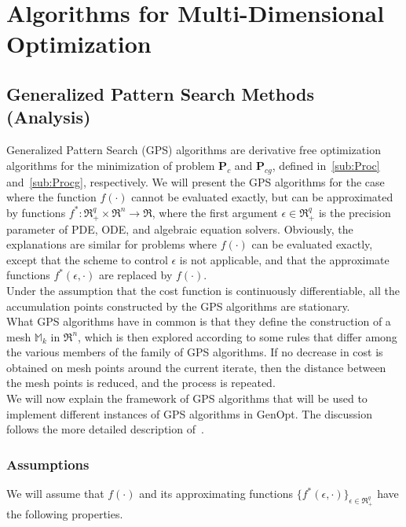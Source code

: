 \chapter{Algorithms for Multi-Dimensional Optimization}
\label{sec:algImp}
\section{Generalized Pattern Search Methods (Analysis)}
Generalized Pattern Search (GPS) algorithms are 
derivative free optimization algorithms for the minimization of
problem $\mathbf P_c$ and $\mathbf P_{cg}$, defined in~\eqref{sub:Proc}
and~\eqref{sub:Procg}, respectively.
We will present the GPS algorithms for the case where 
the function $f(\cdot)$ cannot be evaluated exactly,
but can be approximated by functions $f^* \colon \Re_+^q \times \Re^n \to \Re$, 
where the first argument $\epsilon \in \Re_+^q$ is 
the precision parameter of PDE, ODE, and algebraic equation solvers.
Obviously, the explanations are similar for problems where
$f(\cdot)$ can be evaluated exactly, except that the scheme to
control $\epsilon$ is not applicable, and that
the approximate functions $f^*(\epsilon,\cdot)$ are replaced by $f(\cdot)$.\\

Under the assumption that the cost function is continuously
differentiable, all the accumulation points constructed by
the GPS algorithms are stationary.\\

What GPS algorithms have in common is that they define the construction
of a mesh $\mathbb M_k$ in $\Re^n$, 
which is then explored according to some rules
that differ among the various members of the family of GPS algorithms.
If no decrease in cost is obtained on mesh points around the current iterate,
then the distance between the mesh points is reduced,
and the process is repeated.\\

We will now explain the framework of GPS algorithms that will be used
to implement different instances of GPS algorithms in GenOpt.
The discussion follows the more detailed description of~\cite{PolakWetter2003:1}.\\
\pagebreak

\subsection{Assumptions}
We will assume that $f(\cdot)$ and its 
approximating functions $\{ f^*(\epsilon,\cdot) \}_{\epsilon \in \Re_+^q}$ 
have the following properties.

